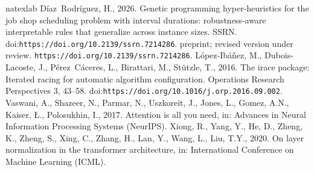 \documentclass[preprint,authoryear,12pt]{elsarticle}
\providecommand{\doi}[1]{\href{https://doi.org/#1}{\nolinkurl{https://doi.org/#1}}}
\begin{document}
\begin{thebibliography}{4}
\expandafter\ifx\csname natexlab\endcsname\relax\def\natexlab#1{#1}\fi
\providecommand{\url}[1]{\texttt{#1}}
\providecommand{\href}[2]{#2}
\providecommand{\path}[1]{#1}
\providecommand{\DOIprefix}{doi:}
\providecommand{\ArXivprefix}{arXiv:}
\providecommand{\URLprefix}{URL: }
\providecommand{\Pubmedprefix}{pmid:}
\providecommand{\doi}[1]{\href{http://dx.doi.org/#1}{\path{#1}}}
\providecommand{\Pubmed}[1]{\href{pmid:#1}{\path{#1}}}
\providecommand{\bibinfo}[2]{#2}
\ifx\xfnm\relax \def\xfnm[#1]{\unskip,\space#1}\fi
\bibinfo{author}{D{\'i}az~Rodr{\'i}guez, H.}, \bibinfo{year}{2026}.
\newblock \bibinfo{title}{Genetic programming hyper-heuristics for the job shop
  scheduling problem with interval durations: robustness-aware interpretable
  rules that generalize across instance sizes}.
\newblock \bibinfo{howpublished}{SSRN}.
\newblock \DOIprefix\doi{10.2139/ssrn.7214286}. \bibinfo{note}{preprint;
  revised version under review. \doi{10.2139/ssrn.7214286}}.
\bibinfo{author}{L{\'o}pez-Ib{\'a}{\~n}ez, M.},
  \bibinfo{author}{Dubois-Lacoste, J.}, \bibinfo{author}{P{\'e}rez~C{\'a}ceres,
  L.}, \bibinfo{author}{Birattari, M.}, \bibinfo{author}{St{\"u}tzle, T.},
  \bibinfo{year}{2016}.
\newblock \bibinfo{title}{The irace package: Iterated racing for automatic
  algorithm configuration}.
\newblock \bibinfo{journal}{Operations Research Perspectives}
  \bibinfo{volume}{3}, \bibinfo{pages}{43--58}.
\newblock \DOIprefix\doi{10.1016/j.orp.2016.09.002}.
\bibinfo{author}{Vaswani, A.}, \bibinfo{author}{Shazeer, N.},
  \bibinfo{author}{Parmar, N.}, \bibinfo{author}{Uszkoreit, J.},
  \bibinfo{author}{Jones, L.}, \bibinfo{author}{Gomez, A.N.},
  \bibinfo{author}{Kaiser, {\L}.}, \bibinfo{author}{Polosukhin, I.},
  \bibinfo{year}{2017}.
\newblock \bibinfo{title}{Attention is all you need}, in:
  \bibinfo{booktitle}{Advances in Neural Information Processing Systems
  ({NeurIPS})}.
\bibinfo{author}{Xiong, R.}, \bibinfo{author}{Yang, Y.}, \bibinfo{author}{He,
  D.}, \bibinfo{author}{Zheng, K.}, \bibinfo{author}{Zheng, S.},
  \bibinfo{author}{Xing, C.}, \bibinfo{author}{Zhang, H.},
  \bibinfo{author}{Lan, Y.}, \bibinfo{author}{Wang, L.}, \bibinfo{author}{Liu,
  T.Y.}, \bibinfo{year}{2020}.
\newblock \bibinfo{title}{On layer normalization in the transformer
  architecture}, in: \bibinfo{booktitle}{International Conference on Machine
  Learning ({ICML})}.

\end{thebibliography}
\end{document}
